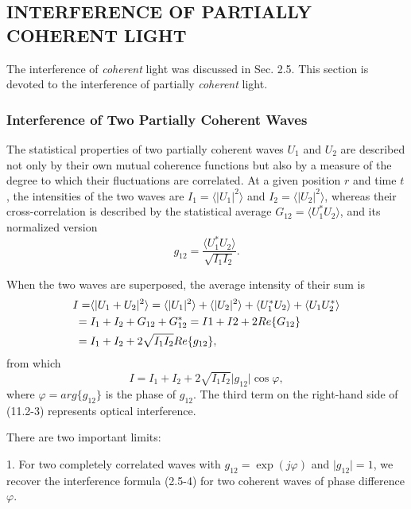 \documentclass{article}
\numberwithin{figure}{subsection}
\numberwithin{table}{subsection}
\begin{document}
\bigbreak\begingroup
\color{ksc}
\subsection{INTERFERENCE OF PARTIALLY COHERENT LIGHT}
\endgroup
The interference of \textsl{coherent} light was discussed in Sec. 2.5. This section is devoted to the interference of partially \textsl{coherent} light.

\bigbreak\begingroup
\color{ksc}
\subsubsection{Interference of Two Partially Coherent Waves}
\endgroup
The statistical properties of two partially coherent waves $ U_1 $ and $ U_2 $ are described not only by their own mutual coherence functions but also by a measure of the degree to which their fluctuations are correlated. At a given position $ r $ and time $ t $, the intensities of the two waves are $ I_1 = \langle \lvert U_1 \rvert ^2 \rangle $ and $ I_2 = \langle \lvert U_2 \rvert ^2 \rangle $, whereas their cross-correlation is described by the statistical average $ G_{12} = \langle U_1^\ast U_2 \rangle $, and its normalized version
\begin{equation}
g_{12} = \frac{\langle U_1^\ast U_2 \rangle}{\sqrt{I_1 I_2}} .
\end{equation}
\par When the two waves are superposed, the average intensity of their sum is
\begin{align}
I = & \langle \lvert U_1 + U_2 \rvert ^2 \rangle = \langle \lvert U_1 \rvert ^2 \rangle + \langle \lvert U_2 \rvert ^2 \rangle + \langle U_1^\ast U_2 \rangle + \langle U_1 U_2^\ast \rangle \notag \\
={} & I_1 + I_2 + G_{12} + G_{12}^\ast = I1 + I2 + 2 Re\{ G_{12} \} \notag \\
={} & I_1 + I_2 + 2\sqrt{I_1 I_2}Re\{ g_{12} \},
\end{align}
from which
\begin{equation}
I = I_1 + I_2 + 2\sqrt{I_1 I_2} \lvert g_{12} \rvert \cos \varphi ,
\end{equation}
where $ \varphi = arg\{ g_{12} \} $ is the phase of $ g_{12} $. The third term on the right-hand side of (11.2-3) represents optical interference.
\par There are two important limits:
\bigbreak\par 1. For two completely correlated waves with $ g_{12} = \exp (j\varphi) $ and $ \lvert g_{12} \rvert = 1 $, we recover the interference formula (2.5-4) for two coherent waves of phase difference $ \varphi $.
\end{document}
